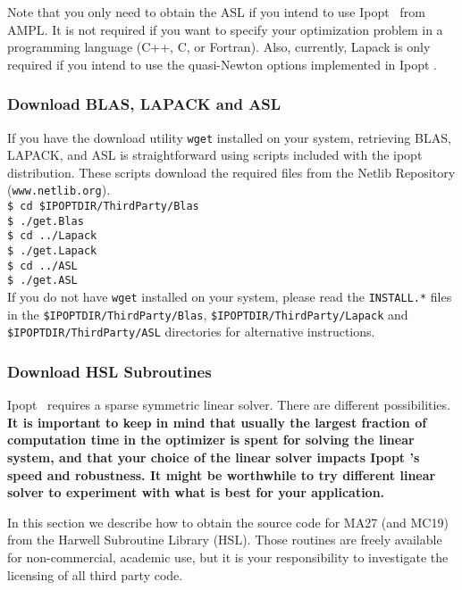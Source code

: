 \documentclass[10pt]{article}
\newcommand{\Ipopt}{{\sc Ipopt }}
\begin{document}
Note that you only need to obtain the ASL if you intend to use \Ipopt\
from AMPL.  It is not required if you want to specify your
optimization problem in a programming language (C++, C, or Fortran).
Also, currently, Lapack is only required if you intend to use the
quasi-Newton options implemented in \Ipopt.

\subsubsection{Download BLAS, LAPACK and ASL}
If you have the download utility \texttt{wget} installed on your
system, retrieving BLAS, LAPACK, and ASL is straightforward using
scripts included with the ipopt distribution. These scripts download
the required files from the Netlib Repository
(\texttt{www.netlib.org}).\\

\noindent
{\tt \$ cd \$IPOPTDIR/ThirdParty/Blas}\\
{\tt \$ ./get.Blas}\\
{\tt \$ cd ../Lapack}\\
{\tt \$ ./get.Lapack}\\
{\tt \$ cd ../ASL}\\
{\tt \$ ./get.ASL}\\

\noindent
If you do not have \texttt{wget} installed on your system, please read
the \texttt{INSTALL.*} files in the
\texttt{\$IPOPTDIR/ThirdParty/Blas},
\texttt{\$IPOPTDIR/ThirdParty/Lapack} and
\texttt{\$IPOPTDIR/ThirdParty/ASL} directories for alternative
instructions.

\subsubsection{Download HSL Subroutines}
\Ipopt\ requires a sparse symmetric linear solver.  There are
different possibilities.  {\bf It is important to keep in mind that usually
the largest fraction of computation time in the optimizer is spent for
solving the linear system, and that your choice of the linear solver
impacts \Ipopt's speed and robustness.  It might be worthwhile to try
different linear solver to experiment with what is best for your
application.}

In this section we describe how to obtain the source code for MA27
(and MC19) from the Harwell Subroutine Library (HSL).  Those routines
are freely available for non-commercial, academic use, but it is your
responsibility to investigate the licensing of all third party code.
\end{document}
